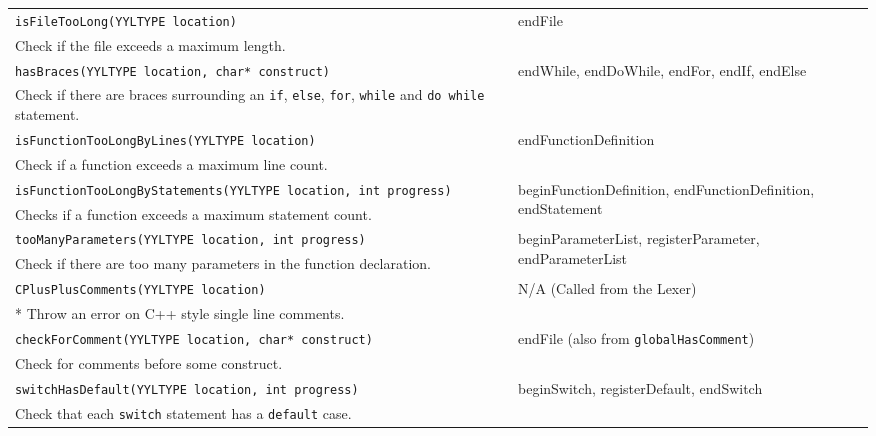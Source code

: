 \documentclass[12pt]{report}
\begin{document}
\begin{longtable}{p{10cm} p{\saxColSize}}
		\lstinline!isFileTooLong(YYLTYPE location)! & \multirow{2}{\saxColSize}{endFile} \\*
			 Check if the file exceeds a maximum length.  \vspace{\vertSize} \\
		\lstinline!hasBraces(YYLTYPE location, char* construct)! & \multirow{2}{\saxColSize}{endWhile, endDoWhile, endFor, endIf, endElse} \\*
			 Check if there are braces surrounding an \lstinline!if!, \lstinline!else!, \lstinline!for!, \lstinline!while! and \lstinline!do while! statement. \vspace{\vertSize} \\
		\lstinline!isFunctionTooLongByLines(YYLTYPE location)! & \multirow{2}{\saxColSize}{endFunctionDefinition} \\*
			 Check if a function exceeds a maximum line count. \vspace{\vertSize} \\
		\lstinline!isFunctionTooLongByStatements(YYLTYPE location, int progress)! & \multirow{2}{\saxColSize}{beginFunctionDefinition, endFunctionDefinition, endStatement} \\*
			 Checks if a function exceeds a maximum statement count. \vspace{\vertSize} \\
		\lstinline!tooManyParameters(YYLTYPE location, int progress)! & \multirow{2}{\saxColSize}{beginParameterList, registerParameter, endParameterList} \\*
			 Check if there are too many parameters in the function declaration. \vspace{\vertSize} \\
		\lstinline!CPlusPlusComments(YYLTYPE location)! & \multirow{2}{\saxColSize}{N/A (Called from the Lexer)} \\ *
		Throw an error on C++ style single line comments. \vspace{\vertSize} \\
		\lstinline!checkForComment(YYLTYPE location, char* construct)!  & \multirow{2}{\saxColSize}{endFile (also from \lstinline!globalHasComment!)} \\*
			 Check for comments before some construct. \vspace{\vertSize} \\
		\lstinline!switchHasDefault(YYLTYPE location, int progress)! & \multirow{2}{\saxColSize}{beginSwitch, registerDefault, endSwitch} \\*
		 Check that each \lstinline!switch! statement has a \lstinline!default! case. \vspace{\vertSize} \\

\end{longtable}
\end{document}
